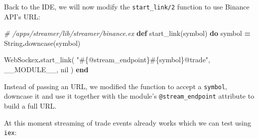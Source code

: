 \documentclass[
]{book}
\newenvironment{Shaded}{\begin{snugshade}}{\end{snugshade}}
\newcommand{\CommentTok}[1]{\textcolor[rgb]{0.56,0.35,0.01}{\textit{#1}}}
\newcommand{\ConstantTok}[1]{\textcolor[rgb]{0.00,0.00,0.00}{#1}}
\newcommand{\KeywordTok}[1]{\textcolor[rgb]{0.13,0.29,0.53}{\textbf{#1}}}
\newcommand{\NormalTok}[1]{#1}
\newcommand{\OperatorTok}[1]{\textcolor[rgb]{0.81,0.36,0.00}{\textbf{#1}}}
\newcommand{\OtherTok}[1]{\textcolor[rgb]{0.56,0.35,0.01}{#1}}
\newcommand{\StringTok}[1]{\textcolor[rgb]{0.31,0.60,0.02}{#1}}
\begin{document}
Back to the IDE, we will now modify the \texttt{start\_link/2} function to use Binance API's URL:

\begin{Shaded}
\begin{Highlighting}[]
  \CommentTok{\# /apps/streamer/lib/streamer/binance.ex}
  \KeywordTok{def}\NormalTok{ start\_link(symbol) }\KeywordTok{do}
\NormalTok{    symbol }\OperatorTok{=} \ConstantTok{String}\OperatorTok{.}\NormalTok{downcase(symbol)}

    \ConstantTok{WebSockex}\OperatorTok{.}\NormalTok{start\_link(}
      \StringTok{"}\OtherTok{\#\{@stream\_endpoint\}\#\{}\NormalTok{symbol}\OtherTok{\}}\StringTok{@trade"}\NormalTok{,}
      \ConstantTok{\_\_MODULE\_\_}\NormalTok{,}
      \ConstantTok{nil}
\NormalTok{    )}
  \KeywordTok{end}
\end{Highlighting}
\end{Shaded}

Instead of passing an URL, we modified the function to accept a \texttt{symbol}, downcase it and use it together with the module's \texttt{@stream\_endpoint} attribute to build a full URL.

At this moment streaming of trade events already works which we can test using \texttt{iex}:
\end{document}
